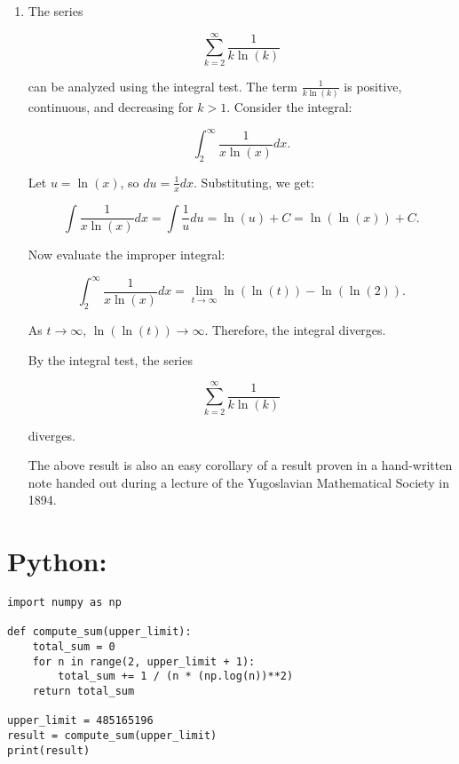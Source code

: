 \documentclass[12pt]{article}
\begin{document}
\begin{enumerate}
\begin{enumerate}
\item 
The series 

\[
\sum_{k=2}^\infty \frac{1}{k \ln(k)}
\]

can be analyzed using the integral test. The term \(\frac{1}{k \ln(k)}\) is positive, continuous, and decreasing for \(k > 1\). Consider the integral:

\[
\int_{2}^\infty \frac{1}{x \ln(x)} dx.
\]

Let \( u = \ln(x) \), so \( du = \frac{1}{x} dx \). Substituting, we get:

\[
\int \frac{1}{x \ln(x)} dx = \int \frac{1}{u} du = \ln(u) + C = \ln(\ln(x)) + C.
\]

Now evaluate the improper integral:

\[
\int_{2}^\infty \frac{1}{x \ln(x)} dx = \lim_{t \to \infty} \ln(\ln(t)) - \ln(\ln(2)).
\]

As \( t \to \infty \), \(\ln(\ln(t)) \to \infty\). Therefore, the integral diverges.

By the integral test, the series 

\[
\sum_{k=2}^\infty \frac{1}{k \ln(k)}
\]

diverges.


The above result is also an easy corollary of a result proven in a hand-written note handed out during a lecture of the Yugoslavian Mathematical Society in 1894.

\end{enumerate}

\end{enumerate}

\section*{Python:}
\begin{lstlisting}
import numpy as np

def compute_sum(upper_limit):
    total_sum = 0
    for n in range(2, upper_limit + 1):
        total_sum += 1 / (n * (np.log(n))**2)
    return total_sum

upper_limit = 485165196
result = compute_sum(upper_limit)
print(result)
\end{lstlisting}
\end{document}
